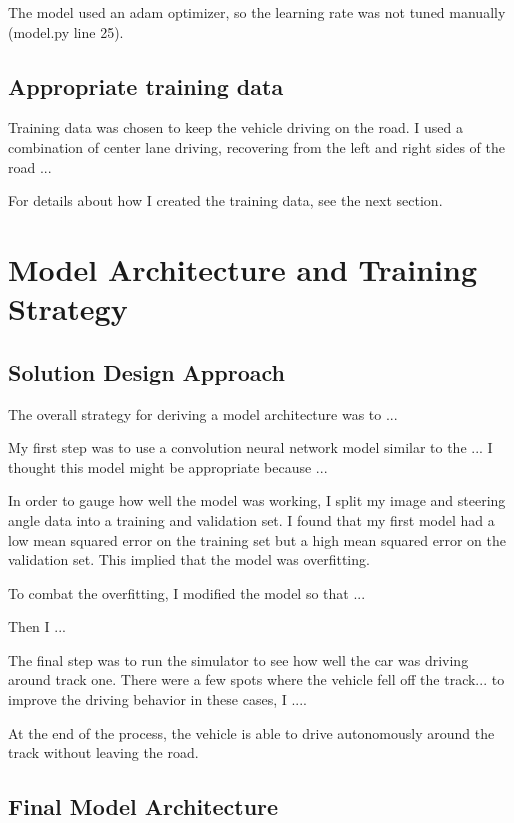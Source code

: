 \documentclass[a4paper, 11pt, DIV=14]{scrartcl}
\begin{document}
The model used an adam optimizer, so the learning rate was not tuned manually (model.py line 25).

\subsection{Appropriate training data}

Training data was chosen to keep the vehicle driving on the road. I used a combination of center lane driving, recovering from the left and right sides of the road ... 

For details about how I created the training data, see the next section. 

\section{Model Architecture and Training Strategy}

\subsection{Solution Design Approach}

The overall strategy for deriving a model architecture was to ...

My first step was to use a convolution neural network model similar to the ... I thought this model might be appropriate because ...

In order to gauge how well the model was working, I split my image and steering angle data into a training and validation set. I found that my first model had a low mean squared error on the training set but a high mean squared error on the validation set. This implied that the model was overfitting. 

To combat the overfitting, I modified the model so that ...

Then I ... 

The final step was to run the simulator to see how well the car was driving around track one. There were a few spots where the vehicle fell off the track... to improve the driving behavior in these cases, I ....

At the end of the process, the vehicle is able to drive autonomously around the track without leaving the road.

\subsection{Final Model Architecture}
\end{document}
